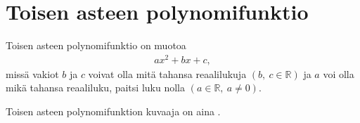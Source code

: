 \section{Toisen asteen polynomifunktio}


Toisen asteen polynomifunktio on muotoa
\begin{align*}
ax^2+bx+c,
\end{align*}
missä vakiot $b$ ja $c$ voivat olla mitä tahansa reaalilukuja $(b, \ c \in \mathbb{R})$ ja $a$ voi olla mikä tahansa reaaliluku, paitsi luku nolla $(a \in \mathbb{R}, \ a \neq 0)$.

Toisen asteen polynomifunktion kuvaaja on aina .
